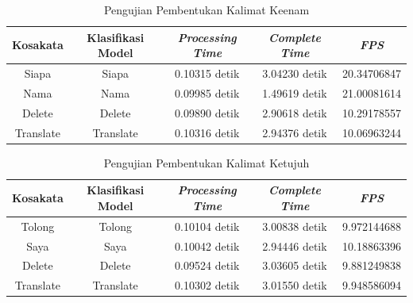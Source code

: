 \begin{longtable}{|c|c|c|c|c|}
  \caption{Pengujian Pembentukan Kalimat Keenam}
  \label{tb:prediksikombinasi6}                                   \\
  \hline
  \rowcolor[HTML]{C0C0C0}
  \textbf{Kosakata} & \textbf{Klasifikasi Model} & \textbf{\emph{Processing Time}} & \textbf{\emph{Complete Time}} & \textbf{\emph{FPS}}\\
  \hline
  Siapa             & Siapa                          & 0.10315 detik                           & 3.04230 detik                                  & 20.34706847\\
  Nama              & Nama                           & 0.09985 detik                           & 1.49619 detik                                  & 21.00081614\\
  Delete            & Delete                         & 0.09890 detik                           & 2.90618 detik                                  & 10.29178557\\
  Translate         & Translate                      & 0.10316 detik                           & 2.94376 detik                                  & 10.06963244\\
  \hline
\end{longtable}


\newpage
\begin{longtable}{|c|c|c|c|c|}
  \caption{Pengujian Pembentukan Kalimat Ketujuh}
  \label{tb:prediksikombinasi7}                                   \\
  \hline
  \rowcolor[HTML]{C0C0C0}
  \textbf{Kosakata} & \textbf{Klasifikasi Model} & \textbf{\emph{Processing Time}} & \textbf{\emph{Complete Time}} & \textbf{\emph{FPS}}\\
  \hline
  Tolong             & Tolong                         & 0.10104 detik                           & 3.00838 detik                                  & 9.972144688\\
  Saya               & Saya                           & 0.10042 detik                           & 2.94446 detik                                  & 10.18863396\\
  Delete             & Delete                         & 0.09524 detik                           & 3.03605 detik                                  & 9.881249838\\
  Translate          & Translate                      & 0.10302 detik                           & 3.01550 detik                                  & 9.948586094\\
  \hline
\end{longtable}


